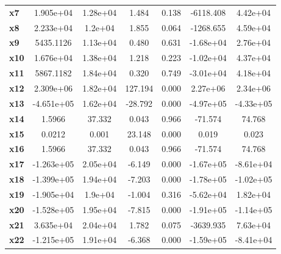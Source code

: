 \documentclass{article}
\begin{document}
\begin{center}
{\begin{tabular}{lcccccc}
\textbf{x7}    &    1.905e+04  &     1.28e+04     &     1.484  &         0.138        &    -6118.408    &     4.42e+04     \\
\textbf{x8}    &    2.233e+04  &      1.2e+04     &     1.855  &         0.064        &    -1268.655    &     4.59e+04     \\
\textbf{x9}    &    5435.1126  &     1.13e+04     &     0.480  &         0.631        &    -1.68e+04    &     2.76e+04     \\
\textbf{x10}   &    1.676e+04  &     1.38e+04     &     1.218  &         0.223        &    -1.02e+04    &     4.37e+04     \\
\textbf{x11}   &    5867.1182  &     1.84e+04     &     0.320  &         0.749        &    -3.01e+04    &     4.18e+04     \\
\textbf{x12}   &    2.309e+06  &     1.82e+04     &   127.194  &         0.000        &     2.27e+06    &     2.34e+06     \\
\textbf{x13}   &   -4.651e+05  &     1.62e+04     &   -28.792  &         0.000        &    -4.97e+05    &    -4.33e+05     \\
\textbf{x14}   &       1.5966  &       37.332     &     0.043  &         0.966        &      -71.574    &       74.768     \\
\textbf{x15}   &       0.0212  &        0.001     &    23.148  &         0.000        &        0.019    &        0.023     \\
\textbf{x16}   &       1.5966  &       37.332     &     0.043  &         0.966        &      -71.574    &       74.768     \\
\textbf{x17}   &   -1.263e+05  &     2.05e+04     &    -6.149  &         0.000        &    -1.67e+05    &    -8.61e+04     \\
\textbf{x18}   &   -1.399e+05  &     1.94e+04     &    -7.203  &         0.000        &    -1.78e+05    &    -1.02e+05     \\
\textbf{x19}   &   -1.905e+04  &      1.9e+04     &    -1.004  &         0.316        &    -5.62e+04    &     1.82e+04     \\
\textbf{x20}   &   -1.528e+05  &     1.95e+04     &    -7.815  &         0.000        &    -1.91e+05    &    -1.14e+05     \\
\textbf{x21}   &    3.635e+04  &     2.04e+04     &     1.782  &         0.075        &    -3639.935    &     7.63e+04     \\
\textbf{x22}   &   -1.215e+05  &     1.91e+04     &    -6.368  &         0.000        &    -1.59e+05    &    -8.41e+04     \\

\end{tabular}}
\end{center}
\end{document}
